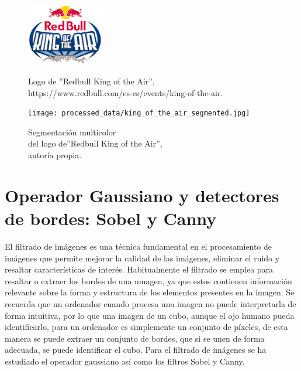 \documentclass[a4paper,12pt]{article}
\begin{document}
{\begin{figure}[H]
\end{figure}

\begin{figure}[H]
  
  \begin{minipage}[t]{0.6\textwidth}
    \includegraphics[width=0.3\textwidth]{data/king_of_the_air.png}
    \caption{Logo de ''Redbull King of the Air'',\\https://www.redbull.com/es-es/events/king-of-the-air.}
    \label{fig:redbull_original}
  \end{minipage}
  \hfill
  \hspace{1.5cm}
  \begin{minipage}[t]{0.6\textwidth}
    \texttt{[image: processed\_data/king\_of\_the\_air\_segmented.jpg]}
    \caption{Segmentación multicolor\\del logo de''Redbull King of the Air'',\\ autoría propia.}
    \label{fig:redbull_segmentation}
  \end{minipage}

\end{figure}


\section{Operador Gaussiano y detectores de bordes: Sobel y Canny}


\vspace{1cm}

El filtrado de imágenes es una técnica fundamental en el procesamiento de imágenes que permite mejorar la calidad de las imágenes, eliminar el ruido y resaltar 
características de interés. Habitualmente el filtrado se emplea para resaltar o extraer los bordes de una umagen, ya que estos contienen información relevante
sobre la forma y estructura de los elementos presentes en la imagen. Se recuerda que un ordenador cuando procesa una imagen no puede interpretarla de forma intuitiva,
por lo que una imagen de un cubo, aunque el ojo humano pueda identificarlo, para un ordenador es simplemente un conjunto de píxeles, de esta manera se puede extraer un
conjunto de bordes, que si se unen de forma adecuada, se puede identificar el cubo.  Para el filtrado de imágenes se ha estudiado el operador gaussiano así como los 
filtros Sobel y Canny.

}
\end{document}
